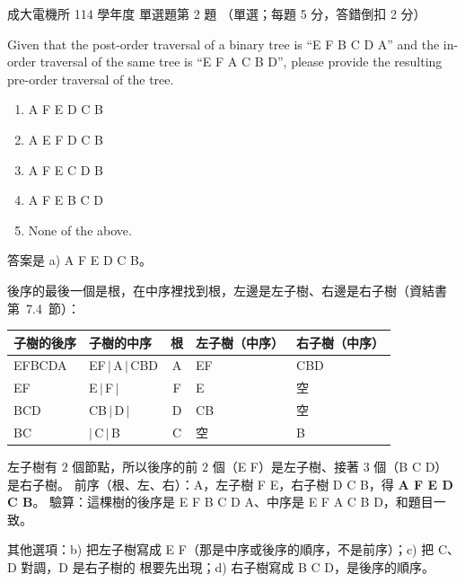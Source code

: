 \begin{pastexam}[label={px:ncku-114-ee-ds-02}]{成大電機所 114 學年度 單選題第 2 題}
（單選；每題 5 分，答錯倒扣 2 分）

Given that the post-order traversal of a binary tree is ``E F B C D A'' and the in-order
traversal of the same tree is ``E F A C B D'', please provide the resulting pre-order traversal
of the tree.
\begin{enumerate}[label=\alph*)]
\item A F E D C B
\item A E F D C B
\item A F E C D B
\item A F E B C D
\item None of the above.
\end{enumerate}
\end{pastexam}

\begin{pastsoln}
答案是 a) A F E D C B。

後序的最後一個是根，在中序裡找到根，左邊是左子樹、右邊是右子樹（資結書第~7.4~節）：
\begin{center}
\begin{tabular}{llcll}
\toprule
子樹的後序 & 子樹的中序 & 根 & 左子樹（中序） & 右子樹（中序） \\
\midrule
EFBCDA & EF\,$|$\,A\,$|$\,CBD & A & EF & CBD \\
EF & E\,$|$\,F\,$|$ & F & E & 空 \\
BCD & CB\,$|$\,D\,$|$ & D & CB & 空 \\
BC & $|$\,C\,$|$\,B & C & 空 & B \\
\bottomrule
\end{tabular}
\qquad
{}
\end{center}
左子樹有 $2$ 個節點，所以後序的前 $2$ 個（E F）是左子樹、接著 $3$ 個（B C D）是右子樹。
前序（根、左、右）：A，左子樹 F E，右子樹 D C B，得 \textbf{A F E D C B}。 驗算：這棵樹的後序是
E F B C D A、中序是 E F A C B D，和題目一致。

其他選項：b) 把左子樹寫成 E F（那是中序或後序的順序，不是前序）；c) 把 C、D 對調，D 是右子樹的
根要先出現；d) 右子樹寫成 B C D，是後序的順序。
\end{pastsoln}
